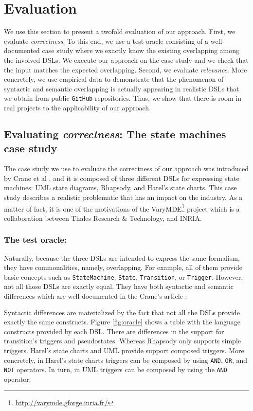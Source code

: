 \section{Evaluation}
\label{sec:validation}

We use this section to present a twofold evaluation of our approach. First, we evaluate \textit{correctness}. To this end, we use a test oracle consisting of a well-documented case study where we exactly know the existing overlapping among the involved DSLs. We execute our approach on the case study and we check that the input matches the expected overlapping. Second, we evaluate \textit{relevance}. More concretely, we use empirical data to demonstrate that the phenomenon of syntactic and semantic overlapping is actually appearing in realistic DSLs that we obtain from public \texttt{GitHub} repositories. Thus, we show that there is room in real projects to the applicability of our approach.  

\subsection{Evaluating \textit{correctness}: The state machines case study}

The case study we use to evaluate the correctness of our approach was introduced by Crane et al \cite{Crane:2007}, and it is composed of three different DSLs for expressing state machines: UML state diagrams, Rhapsody, and Harel's state charts. This case study describes a realistic problematic that has an impact on the industry. As a matter of fact, it is one of the motivations of the VaryMDE\footnote{\url{http://varymde.gforge.inria.fr/}} project which is a collaboration between Thales Research \& Technology, and INRIA.

\vspace{-3mm}
\subsubsection{The test oracle:} Naturally, because the three DSLs are intended to express the same formalism, they have commonalities, namely, overlapping. For example, all of them provide basic concepts such as \texttt{StateMachine}, \texttt{State}, \texttt{Transition}, or \texttt{Trigger}. However, not all those DSLs are exactly equal. They have both syntactic and semantic differences which are well documented in the Crane's article \cite{Crane:2007}.

Syntactic differences are materialized by the fact that not all the DSLs provide exactly the same constructs. Figure \ref{fig:oracle} shows a table with the language constructs provided by each DSL. There are differences in the support for transition's triggers and pseudostates. Whereas Rhapsody only supports simple triggers. Harel's state charts and UML provide support composed triggers. More concretely, in Harel's state charts triggers can be composed by using \texttt{AND}, \texttt{OR}, and \texttt{NOT} operators. In turn, in UML triggers can be composed by using  the \texttt{AND} operator.

